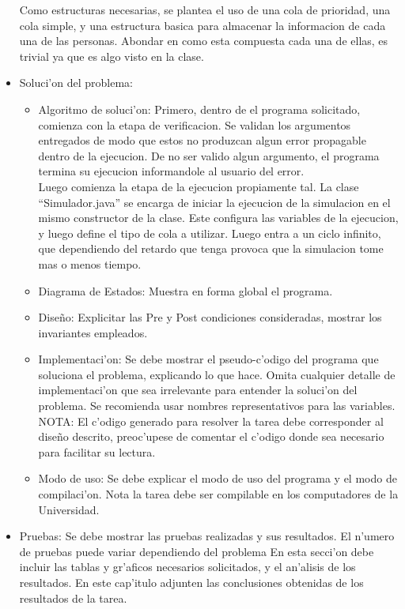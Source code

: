 \label{•} \documentclass[11pt]{utalcaDoc}
\begin{document}
\begin{itemize}
Como estructuras necesarias, se plantea el uso de una cola de prioridad, una cola simple, y una estructura basica para almacenar la informacion de cada una de las personas. Abondar en como esta compuesta cada una de ellas, es trivial ya que es algo visto en la clase.\\

\item Soluci'on del problema:
  \begin{itemize}
  \item Algoritmo de soluci'on: Primero, dentro de el programa solicitado, comienza con la etapa de verificacion. Se validan los argumentos entregados de modo que estos no produzcan algun error propagable dentro de la ejecucion. De no ser valido algun argumento, el programa termina su ejecucion informandole al usuario del error.\\
  Luego comienza la etapa de la ejecucion propiamente tal. La clase ``Simulador.java'' se encarga de iniciar la ejecucion de la simulacion en el mismo constructor de la clase. Este configura las variables de la ejecucion, y luego define el tipo de cola a utilizar. Luego entra a un ciclo infinito, que dependiendo del retardo que tenga provoca que la simulacion tome mas o menos tiempo. 
  
  \item Diagrama de Estados: Muestra en forma global el programa.
  
  \item Dise\~no: Explicitar las Pre y Post condiciones consideradas,
  mostrar los invariantes empleados.

  \item Implementaci'on: Se debe mostrar el pseudo-c'odigo del programa que
  soluciona el problema, explicando lo que hace. Omita cualquier detalle de
  implementaci'on que sea irrelevante para entender la soluci'on del problema.
  Se recomienda usar nombres representativos para las variables.
  NOTA: El c'odigo generado para resolver la tarea debe corresponder al
  dise\~no descrito, preoc'upese de comentar el c'odigo donde sea necesario
  para facilitar su lectura.
  
  \item Modo de uso: Se debe explicar el modo de uso del programa y el modo
  de compilaci'on. Nota la tarea debe ser compilable en los computadores de la Universidad.
  \end{itemize}

\item Pruebas: Se debe mostrar las pruebas realizadas y sus resultados.
El n'umero de pruebas puede variar dependiendo del problema
En esta secci'on debe incluir las tablas y gr'aficos necesarios solicitados,
y el an'alisis de los resultados. En este cap'itulo adjunten las conclusiones
obtenidas de los resultados de la tarea.


\end{itemize}
\end{document}

